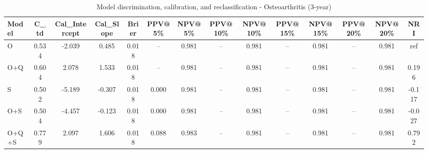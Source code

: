 \begin{table}[htbp]
\centering
\small
\caption{Model discrimination, calibration, and reclassification - Osteoarthritis (3-year)}
\label{tab:perf_osteoarthritis_3y}
\begin{tabular}{lccccccccccccc}
\toprule
Model & C\_td & Cal\_Intercept & Cal\_Slope & Brier & PPV@5\% & NPV@5\% & PPV@10\% & NPV@10\% & PPV@15\% & NPV@15\% & PPV@20\% & NPV@20\% & NRI \\
\midrule
O & 0.534 & -2.039 & 0.485 & 0.018 & -- & 0.981 & -- & 0.981 & -- & 0.981 & -- & 0.981 & ref \\
O+Q & 0.604 & 2.078 & 1.533 & 0.018 & -- & 0.981 & -- & 0.981 & -- & 0.981 & -- & 0.981 & 0.196 \\
S & 0.502 & -5.189 & -0.307 & 0.018 & 0.000 & 0.981 & -- & 0.981 & -- & 0.981 & -- & 0.981 & -0.117 \\
O+S & 0.504 & -4.457 & -0.123 & 0.018 & 0.000 & 0.981 & -- & 0.981 & -- & 0.981 & -- & 0.981 & -0.027 \\
O+Q+S & 0.779 & 2.097 & 1.606 & 0.018 & 0.088 & 0.983 & -- & 0.981 & -- & 0.981 & -- & 0.981 & 0.792 \\
\bottomrule
\end{tabular}
\end{table}